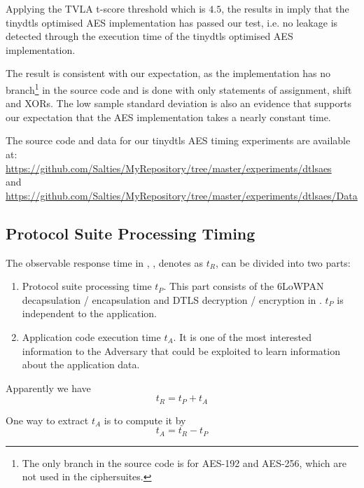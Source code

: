 Applying the TVLA t-score threshold which is $4.5$, the results in  imply that the tinydtls optimised AES implementation has passed our test, i.e. no leakage is detected through the execution time of the tinydtls optimised AES implementation. 

The result is consistent with our expectation, as the implementation has no branch\footnote{The only branch in the source code is for AES-192 and AES-256, which are not used in the ciphersuites.} in the source code and is done with only statements of assignment, shift and XORs. The low sample standard deviation is also an evidence that supports our expectation that the AES implementation takes a nearly constant time.

The source code and data for our tinydtls AES timing experiments are available at: \\
\url{https://github.com/Salties/MyRepository/tree/master/experiments/dtlsaes} \\
and \\
\url{https://github.com/Salties/MyRepository/tree/master/experiments/dtlsaes/Data}

\subsection{Protocol Suite Processing Timing}

The observable response time in , , denotes as $t_R$, can be divided into two parts:

\begin{enumerate}
	\item Protocol suite processing time $t_P$. This part consists of the 6LoWPAN decapsulation / encapsulation and DTLS decryption / encryption in . $t_P$ is independent to the application. 
	\item Application code execution time $t_A$. It is one of the most interested information to the Adversary that could be exploited to learn information about the application data.
\end{enumerate}

Apparently we have
\begin{equation}
t_R = t_P + t_A
\end{equation}

One way to extract $t_A$ is to compute it by 
\begin{equation} \label{Eq: t_A}
t_A = t_R - t_P
\end{equation}

